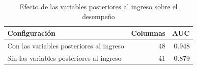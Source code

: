 \begin{table}[H]
\centering
\caption{Efecto de las variables posteriores al ingreso sobre el desempeño}
\label{tab:fuga}
\small
\begin{tabular}{p{6.5cm} r r}
\toprule
\textbf{Configuración} & \textbf{Columnas} & \textbf{AUC} \\
\midrule
Con las variables posteriores al ingreso & 48 & 0.948 \\
Sin las variables posteriores al ingreso & 41 & 0.879 \\
\bottomrule
\end{tabular}
\end{table}
